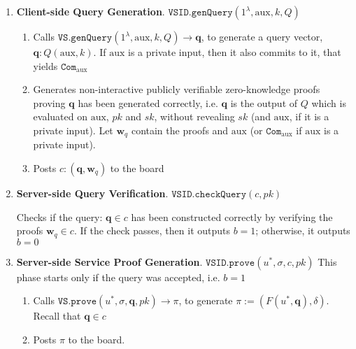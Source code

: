 \begin{enumerate}
\item\textbf{Client-side Query Generation}\label{VSID::Client-side-QueryGeneration}. $\mathtt{VSID.genQuery}(1^{\lambda},  \text{aux},k,Q)$ 
\begin{enumerate}
\item Calls $\mathtt{VS.genQuery}(1^{\lambda}, \text{aux},k,Q)\rightarrow \bm{q}$, to generate a query vector, $\bm{q}:Q(\text{aux},k)$. If $\text{aux}$ is a private input, then it also commits to it,  that yields  $\mathtt{Com}_{\scriptscriptstyle \text{aux}}$
\item Generates non-interactive publicly verifiable zero-knowledge proofs proving $\bm{q}$ has been generated correctly, i.e. $\bm{q}$ is the
output of $Q$ which is evaluated on $\text{aux}$, $pk$ and $sk$, without revealing $sk$ (and $\text{aux}$, if it is a private input). Let $\bm{w}_{\scriptscriptstyle q}$ contain the proofs and  $\text{aux}$ (or  $\mathtt{Com}_{\scriptscriptstyle \text{aux}}$ if $\text{aux}$ is a private input).
\item Posts $c:(\bm{q},\bm{w}_{\scriptscriptstyle q})$ to the board 
\end{enumerate}

\item\textbf{Server-side Query Verification}. $\mathtt{VSID.checkQuery}(c, pk)$

Checks if   the query: $\bm{q}\in c$ has been constructed correctly by verifying the proofs  $\bm{w}_{\scriptscriptstyle q}\in c$. If the check passes, then it outputs $b=1$; otherwise, it outputs $b=0$



\item\textbf{Server-side Service Proof Generation}. $\mathtt{VSID.prove}(u^{\scriptscriptstyle *},\sigma,c,pk)$ This phase starts only if the query was accepted, i.e. $b=1$ 
\begin{enumerate}
\item Calls $\mathtt{VS.prove}(u^{\scriptscriptstyle *},\sigma, \bm{q},pk)\rightarrow \pi$, to generate $\pi:=(F(u^{\scriptscriptstyle *},\bm{q}),\delta)$. Recall that $\bm{q}\in c$
\item Posts $\pi$ to the board. 
\end{enumerate}


\end{enumerate}
